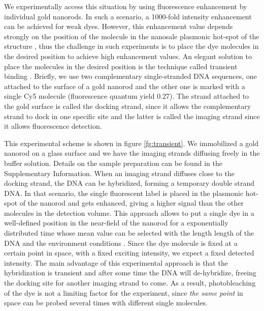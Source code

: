 We experimentally access this situation by using fluorescence enhancement
by individual gold nanorods. In such a scenario, 
a 1000-fold intensity enhancement can be achieved for weak 
dyes\cite{yuan2013thousandfold,khatua2014resonant}. However, this enhancement value
depends strongly on the position of the molecule in the nanosale plasmonic 
hot-spot of the structure \cite{khatua2014resonant}, thus the challenge in 
such experiments is to place the dye molecules in the desired position to 
achieve high enhancement values. An elegant solution to place the molecules 
in the desired position is the technique called transient binding \cite{acuna2012fluorescence}.
Briefly, we use two complementary single-stranded DNA sequences, one attached
 to the surface of a gold nanorod and the other one is marked with a single Cy5
 molecule (fluorescence quantum yield 0.27). The strand attached to the gold 
surface is  called the docking strand, since it allows the complementary strand 
to dock in one specific site and the latter is called the imaging strand since 
it allows fluorescence detection. 

This experimental scheme is shown in figure \ref{fg:transient}. We immobilized 
a gold nanorod on a glass surface and we have the imaging strands diffusing 
freely in the buffer solution. Details on the sample preparation can be found 
in the Supplementary Information. When an imaging strand diffuses close to the 
docking strand, the DNA can be hybridized, forming a temporary double strand DNA. 
In that scenario, the single fluorescent label is placed in the plasmonic 
hot-spot of the nanorod and gets enhanced, giving a higher signal than the 
other molecules in the detection volume. 
This approach allows to put a single dye in a well-defined position in the 
near-field of the nanorod for a exponentially distributed time whose 
mean value can be selected with the length length of the DNA and the 
environment conditions \cite{}. Since the dye molecule is fixed at a 
certain point in space, with a fixed exciting intensity, we expect a 
fixed detected intensity. The main advantage of this experimental 
approach is that the hybridization is transient and after some time 
the DNA will de-hybridize, freeing the docking site for another 
imaging strand to come. As a result, photobleaching of the dye 
is not a limiting factor for the experiment, since \textit{the same point} 
in space can be probed several times with different single molecules.

